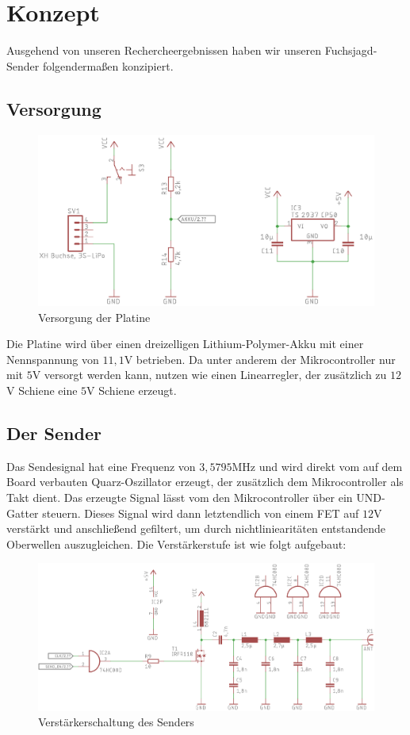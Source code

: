 \section{Konzept}
Ausgehend von unseren Rechercheergebnissen haben wir unseren Fuchsjagd-Sender
folgendermaßen konzipiert.
\subsection{Versorgung}
\begin{figure}[H]
    \centering
    \includegraphics{res/Versorgung.png}
    \caption{Versorgung der Platine}
\end{figure}
Die Platine wird über einen dreizelligen Lithium-Polymer-Akku mit einer Nennspannung
von $11,1$V betrieben. Da unter anderem der Mikrocontroller nur mit $5$V versorgt
werden kann, nutzen wie einen Linearregler, der zusätzlich zu $12$V Schiene eine
$5$V Schiene erzeugt.

\subsection{Der Sender}
Das Sendesignal hat eine Frequenz von $3,5795$MHz und wird direkt vom auf dem Board
verbauten Quarz-Oszillator erzeugt, der zusätzlich dem Mikrocontroller als Takt
dient. Das erzeugte Signal lässt vom den Mikrocontroller über ein UND-Gatter steuern. Dieses
Signal wird dann letztendlich von einem FET auf $12$V verstärkt und anschließend gefiltert,
um durch nichtliniearitäten entstandende Oberwellen auszugleichen. Die Verstärkerstufe ist wie folgt aufgebaut:

\begin{figure}[H]
    \includegraphics{res/Endstufe.png}
    \caption{Verstärkerschaltung des Senders}
\end{figure}

